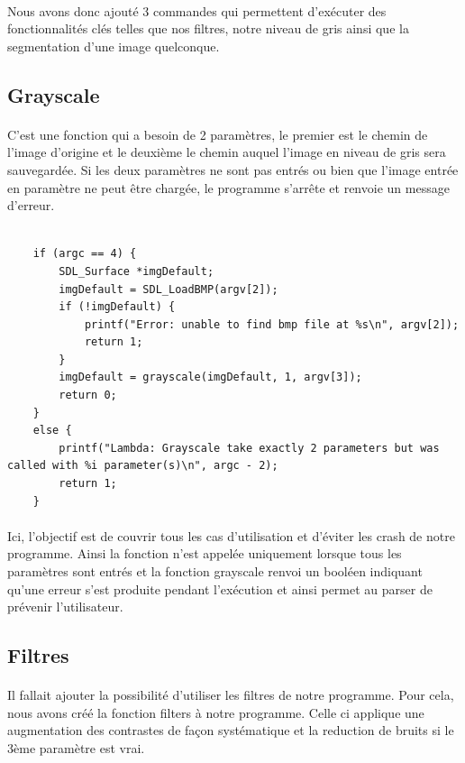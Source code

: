 \documentclass{article}
\begin{document}
\paragraph{}Nous avons donc ajouté 3 commandes qui permettent d'exécuter des fonctionnalités clés telles que nos filtres, notre niveau de gris ainsi que la segmentation d'une image quelconque.

\subsection{Grayscale}

\paragraph{}C'est une fonction qui a besoin de 2 paramètres, le premier est le chemin de l'image d'origine et le deuxième le chemin auquel l'image en niveau de gris sera sauvegardée. Si les deux paramètres ne sont pas entrés ou bien que l'image entrée en paramètre ne peut être chargée, le programme s'arrête et renvoie un message d'erreur.

\begin{lstlisting}

	if (argc == 4) {
		SDL_Surface *imgDefault;
		imgDefault = SDL_LoadBMP(argv[2]);
		if (!imgDefault) {
			printf("Error: unable to find bmp file at %s\n", argv[2]);
			return 1;
		}
		imgDefault = grayscale(imgDefault, 1, argv[3]);
		return 0;
	}
	else {
		printf("Lambda: Grayscale take exactly 2 parameters but was called with %i parameter(s)\n", argc - 2);
		return 1;
	}
\end{lstlisting}

\paragraph{}Ici, l'objectif est de couvrir tous les cas d'utilisation et d'éviter les crash de notre programme. Ainsi la fonction n'est appelée uniquement lorsque tous les paramètres sont entrés et la fonction grayscale renvoi un booléen indiquant qu'une erreur s'est produite pendant l'exécution et ainsi permet au parser de prévenir l'utilisateur.

\subsection{Filtres}

\paragraph{}Il fallait ajouter la possibilité d'utiliser les filtres de notre programme. Pour cela, nous avons créé la fonction filters à notre programme. Celle ci applique une augmentation des contrastes de façon systématique et la reduction de bruits si le 3ème paramètre est vrai.
\end{document}
